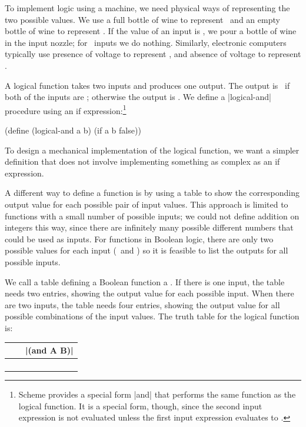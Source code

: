 \begin{schemeregion}
To implement logic using a machine, we need physical ways of representing the two possible values.  We use a full bottle of wine to represent \true\ and an empty bottle of wine to represent \false.  If the value of an input is \true, we pour a bottle of wine in the input nozzle; for \false\ inputs we do nothing.  Similarly, electronic computers typically use presence of voltage to represent \true, and absence of voltage to represent \false.  

  A logical  function takes two inputs and produces one output.  The output is \true\ if both of the inputs are \true; otherwise the output is \false.  We define a \scheme|logical-and| procedure using an if expression:\footnote{Scheme provides a special form \scheme|and| that performs the same function as the logical  function.  It is a special form, though, since the second input expression is not evaluated unless the first input expression evaluates to \true.}
\begin{schemedisplay}
(define (logical-and a b) (if a b false))
\end{schemedisplay}

To design a mechanical implementation of the logical  function, we want a simpler definition that does not involve implementing something as complex as an if expression.  

A different way to define a function is by using a table to show the corresponding output value for each possible pair of input values.  This approach is limited to functions with a small number of possible inputs; we could not define addition on integers this way, since there are infinitely many possible different numbers that could be used as inputs.  For functions in Boolean logic, there are only two possible values for each input (\true\ and \false) so it is feasible to list the outputs for all possible inputs.

We call a table defining a Boolean function a .  If there is one input, the table needs two entries, showing the output value for each possible input.  When there are two inputs, the table needs four entries, showing the output value for all possible combinations of the input values.  The truth table for the logical  function is:

\begin{center}
	\begin{tabular}{cc|c} %
		\var{A} &  \var{B} & \scheme|(and A B)| \\ \hline
		\false & \false & \false \\
		\true & \false & \false \\
		\false & \true & \false \\
		\true & \true & \true \\ %
	\end{tabular}
\end{center}


\end{schemeregion}
